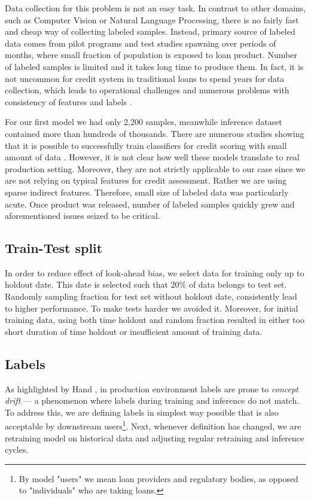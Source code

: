 \documentclass{article}
\begin{document}
Data collection for this problem is not an easy task. In contrast to other domains, such as Computer Vision or Natural Language Processing, there is no fairly fast and cheap way of collecting labeled samples. Instead, primary source of labeled data comes from pilot programs and test studies spawning over periods of months, where small fraction of population is exposed to loan product. Number of labeled samples is limited and it takes long time to produce them. In fact, it is not uncommon for credit system in traditional loans to spend years for data collection, which leads to operational challenges and numerous problems with consistency of features and labels \cite{practical, practical-comment}.

For our first model we had only 2,200 samples, meanwhile inference dataset contained more than hundreds of thousands. There are numerous studies showing that it is possible to successfully train classifiers for credit scoring with small amount of data \cite{credit1,credit2,credit3,credit4}. However, it is not clear how well these models translate to real production setting. Moreover, they are not strictly applicable to our case since we are not relying on typical features for credit assessment. Rather we are using sparse indirect features. Therefore, small size of labeled data was particularly acute. Once product was released, number of labeled samples quickly grew and aforementioned issues seized to be critical.

\subsection{Train-Test split}
In order to reduce effect of look-ahead bias, we select data for training only up to holdout date. This date is selected such that 20\% of data belongs to test set. Randomly sampling fraction for test set without holdout date, consistently lead to higher performance. To make tests harder we avoided it. Moreover, for initial training data, using both time holdout and random fraction resulted in either too short duration of time holdout or insufficient amount of training data.

\subsection{Labels}
As highlighted by Hand \cite{practical}, in production environment labels are prone to \textit{concept drift} --- a phenomenon where labels during training and inference do not match. To address this, we are defining labels in simplest way possible that is also acceptable by downstream users\footnote{By model "users" we mean loan providers and regulatory bodies, as opposed to "individuals" who are taking loans.}. Next, whenever definition has changed, we are retraining model on historical data and adjusting regular retraining and inference cycles.
\end{document}
